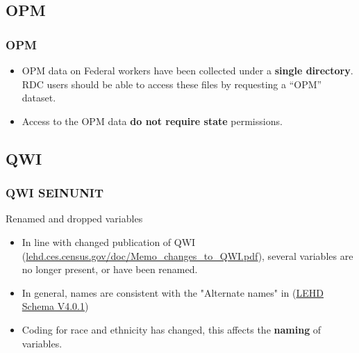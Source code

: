 \documentclass[aspectratio=169]{beamer}
\begin{document}
\subsection{OPM}

\begin{frame}
	\frametitle{\acf{OPM}}
	\begin{itemize}
		\item 	\ac{OPM} data on Federal workers  have been collected under a \textbf{single directory}. RDC users should be able to access these files by requesting a ``OPM'' dataset. 
		\item Access to the OPM data \textbf{do not require state} permissions. 
	\end{itemize}
\end{frame}


\subsection{QWI}

\begin{frame}
\frametitle{\acf{QWI} SEINUNIT}
\begin{block}{Renamed and dropped variables}
	\begin{itemize}
		\item In line with changed publication of QWI (\href{https://lehd.ces.census.gov/doc/Memo_changes_to_QWI.pdf}{lehd.ces.census.gov/doc/Memo\_changes\_to\_QWI.pdf}), several variables are no longer present, or have been renamed. \item In general, names are consistent with the "Alternate names" in  (\href{https://lehd.ces.census.gov/data/schema/V4.0.1/lehd_public_use_schema.html}{LEHD Schema V4.0.1})
	    \item Coding for race and ethnicity has changed, this affects the \textbf{naming} of variables.
\end{itemize}
\end{block}
\end{frame}
\end{document}
